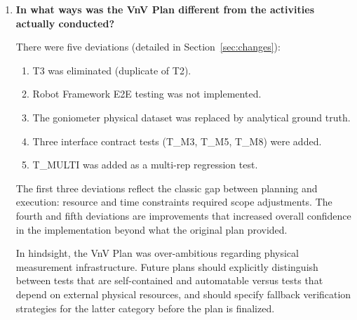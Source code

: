 \documentclass[12pt, titlepage]{article}
\begin{document}
\begin{enumerate}
  The offline backend comparison arose from a question
  by Dr.\ Smith during the MG/MIS presentation: whether the choice of
  MediaPipe 2D in M4 was justified by evidence or by assumption. The offline
  benchmark dataset was designed to answer that question.

  \item \textbf{In what ways was the VnV Plan different from the activities
    actually conducted?}

  There were five deviations (detailed in Section~\ref{sec:changes}):

  \begin{enumerate}
    \item T3 was eliminated (duplicate of T2).
    \item Robot Framework E2E testing was not implemented.
    \item The goniometer physical dataset was replaced by analytical ground truth.
    \item Three interface contract tests (T\_M3, T\_M5, T\_M8) were added.
    \item T\_MULTI was added as a multi-rep regression test.
  \end{enumerate}

  The first three deviations reflect the classic gap between planning and
  execution: resource and time constraints required scope adjustments. The
  fourth and fifth deviations are improvements that increased overall confidence
  in the implementation beyond what the original plan provided.

  In hindsight, the VnV Plan was over-ambitious regarding physical measurement
  infrastructure. Future plans should explicitly distinguish between tests that
  are self-contained and automatable versus tests that depend on external
  physical resources, and should specify fallback verification strategies for
  the latter category before the plan is finalized.

\end{enumerate}
\end{document}
